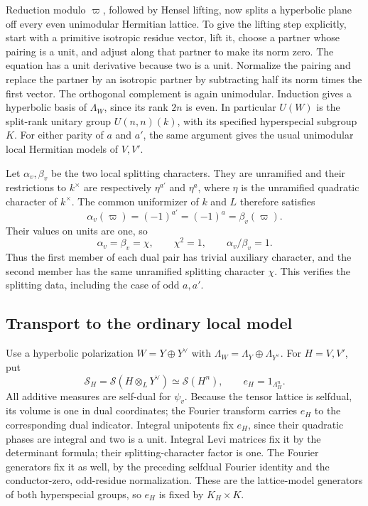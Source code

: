 Reduction modulo \(\varpi\), followed by Hensel lifting, now
splits a hyperbolic plane off every even unimodular Hermitian
lattice. To give the lifting step explicitly, start with a primitive
isotropic residue vector, lift it, choose a partner whose pairing
is a unit, and adjust along that partner to make its norm zero.
The equation has a unit derivative because two is a unit.
Normalize the pairing and replace the partner by an isotropic
partner by subtracting half its norm times the first vector.
The orthogonal complement is again unimodular.
Induction gives a hyperbolic basis of \(\Lambda_W\), since its
rank \(2n\) is even. In particular \(U(W)\) is the split-rank
unitary group \(U(n,n)(k)\), with its specified hyperspecial subgroup
\(K\). For either parity of \(a\) and \(a'\), the same argument
gives the usual unimodular local Hermitian models of \(V,V'\).

Let \(\alpha_v,\beta_v\) be the two local splitting characters.
They are unramified and their restrictions to \(k^\times\)
are respectively \(\eta^{a'}\) and \(\eta^a\), where \(\eta\)
is the unramified quadratic character of \(k^\times\).
The common uniformizer of \(k\) and \(L\) therefore satisfies
\[
 \alpha_v(\varpi)=(-1)^{a'}=(-1)^a=\beta_v(\varpi).
\]
Their values on units are one, so
\begin{equation}\label{eq:sr-inert-character-equality}
 \alpha_v=\beta_v=\chi,\qquad \chi^2=1,\qquad
                 \alpha_v/\beta_v=1.
\end{equation}
Thus the first member of each dual pair has trivial auxiliary
character, and the second member has the same unramified splitting
character \(\chi\). This verifies the splitting data, including
the case of odd \(a,a'\).

\subsection{Transport to the ordinary local model}
Use a hyperbolic polarization \(W=Y\oplus Y^\vee\) with
\(\Lambda_W=\Lambda_Y\oplus\Lambda_{Y^\vee}\).
For \(H=V,V'\), put
\[
 \mathcal S_H=\mathcal S(H\otimes_LY^\vee)
              \simeq\mathcal S(H^n),\qquad
                     e_H=1_{\Lambda_H^n}.
\]
All additive measures are self-dual for \(\psi_v\).
Because the tensor lattice is selfdual, its volume is one
in dual coordinates; the Fourier transform carries \(e_H\)
to the corresponding dual indicator.
Integral unipotents fix \(e_H\), since their quadratic phases
are integral and two is a unit. Integral Levi matrices fix it
by the determinant formula; their splitting-character factor is one.
The Fourier generators fix it as well, by the preceding selfdual
Fourier identity and the conductor-zero, odd-residue normalization.
These are the lattice-model generators of both hyperspecial groups,
so \(e_H\) is fixed by \(K_H\times K\).

